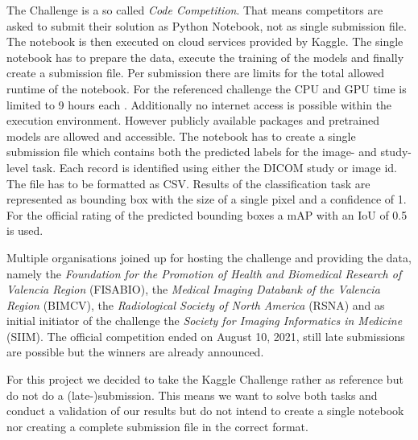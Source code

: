 The Challenge is a so called \textit{Code Competition}. That means competitors are asked to submit their solution as Python Notebook, not as single submission file. The notebook is then executed on cloud services provided by Kaggle. The single notebook has to prepare the data, execute the training of the models and finally create a submission file. Per submission there are limits for the total allowed runtime of the notebook. For the referenced challenge the CPU and GPU time is limited to 9 hours each \autocite{SIIMKaggle}. Additionally no internet access is possible within the execution environment. However publicly available packages and pretrained models are allowed and accessible. The notebook has to create a single submission file which contains both the predicted labels for the image- and study-level task. Each record is identified using either the DICOM study or image id. The file has to be formatted as CSV. Results of the classification task are represented as bounding box with the size of a single pixel and a confidence of 1. For the official rating of the predicted bounding boxes a \ac{mAP} with an \ac{IoU} of 0.5 is used.

Multiple organisations joined up for hosting the challenge and providing the data, namely the \textit{Foundation for the Promotion of Health and Biomedical Research of Valencia Region} (FISABIO), the \textit{Medical Imaging Databank of the Valencia Region} (BIMCV), the \textit{Radiological Society of North America} (RSNA) and as initial initiator of the challenge the \textit{Society for Imaging Informatics in Medicine} (SIIM). The official competition ended on August 10, 2021, still late submissions are possible but the winners are already announced.

For this project we decided to take the Kaggle Challenge rather as reference but do not do a (late-)submission. This means we want to solve both tasks and conduct a validation of our results but do not intend to create a single notebook nor creating a complete submission file in the correct format. 


